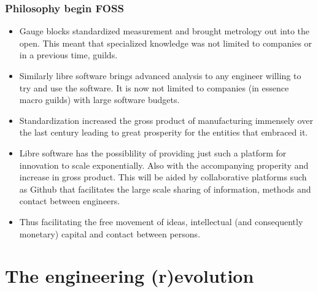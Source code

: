 \documentclass{beamer}
\begin{document}
\begin{frame}
\frametitle{Philosophy begin FOSS}

\begin{itemize}
\item Gauge blocks standardized measurement and brought metrology out into the open.  This meant that specialized knowledge was not limited to companies or in a previous time, guilds.

\item Similarly libre software brings advanced analysis to any engineer willing to try and use the software.  It is now not limited to companies (in essence macro guilds) with large software budgets.

\item Standardization increased the gross product of manufacturing immensely over the last century leading to great prosperity for the entities that embraced it.

\item Libre software has the possiblility of providing just such a platform for innovation to scale exponentially.  Also with the accompanying properity and increase in gross product.
This will be aided by collaborative platforms such as Github that facilitates the large scale sharing of information, methods and contact between engineers.

\item Thus facilitating the free movement of ideas, intellectual (and consequently monetary) capital and contact between persons.

\end{itemize}

\end{frame}

\section{The engineering (r)evolution}

\end{document}

